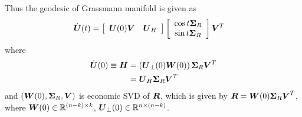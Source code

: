 \documentclass[11pt]{article}
\begin{document}
\begin{enumerate}
Thus the geodesic of Grassmann manifold is given as 
\begin{align}
\dot{\boldsymbol{U}}(t) &= 
\left[\begin{array}{cc}
\boldsymbol{U}(0)\boldsymbol{V} & \boldsymbol{U}_{H}
\end{array}\right]\left[\begin{array}{c}
\cos t\boldsymbol{\Sigma}_{R}\\
\sin t\boldsymbol{\Sigma}_{R} 
\end{array}\right]\boldsymbol{V}^{T} \label{eqn: geo_Grass_curve}
\end{align}
where 
\begin{align}
\dot{\boldsymbol{U}}(0)\equiv \boldsymbol{H} 
&= \left(\boldsymbol{U}_{\bot}(0) \boldsymbol{W}(0)\right)\boldsymbol{\Sigma}_{R} \boldsymbol{V}^{T} \nonumber\\
&= \boldsymbol{U}_{H}\boldsymbol{\Sigma}_{R} \boldsymbol{V}^{T}  \nonumber
\end{align}
and $(\boldsymbol{W}(0), \boldsymbol{\Sigma}_{R}, \boldsymbol{V} )$ is economic SVD of $\boldsymbol{R}$, which is given by $\boldsymbol{R} = 
\boldsymbol{W}(0)\boldsymbol{\Sigma}_{R}\boldsymbol{V}^{T}$, where $\boldsymbol{W}(0)\in {\mathbb R}^{(n-k)\times k}$, $\boldsymbol{U}_{\bot}(0) \in {\mathbb R}^{n\times (n-k)}$.
\end{enumerate}
\end{document}

